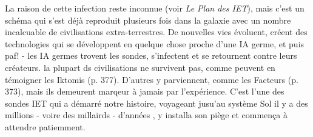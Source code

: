 La raison de cette infection reste inconnue (voir \textit{Le Plan des IET}), mais c'est un schéma qui s'est déjà reproduit plusieurs fois dans la galaxie avec un nombre incalcuable de civilisations extra-terrestres. De nouvelles vies évoluent, créent des technologies qui se développent en quelque chose proche d'une IA germe, et puis paf! - les IA germes trovent les sondes, s'infectent et se retournent contre leurs créateurs. la plupart ds civilisations ne survivent pas, comme peuvent en témoigner les Iktomis (p. 377). D'autres y parviennent, comme les Facteurs (p. 373), mais ils demeurent marqeur à jamais par l'expérience. C'est l'une des sondes IET qui a démarré notre histoire, voyageant jusu'au système Sol il y a des millions - voire des millairds - d'années , y installa son piège et commença à attendre patiemment. 

